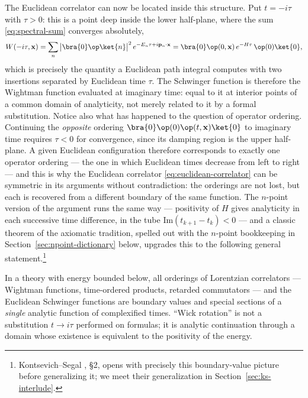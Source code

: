The Euclidean correlator can now be located inside this structure. Put $t =
-i\tau$ with
$\tau > 0$: this is a point deep inside the lower half-plane, where the sum
\eqref{eq:spectral-sum} converges absolutely,
\begin{equation}
W(-i\tau, \mathbf{x}) = \sum_n \big|\bra{0}\op\ket{n}\big|^2\,
   e^{-E_n \tau + i \mathbf{p}_n\cdot\mathbf{x}}
= \bra{0}\op(0,\mathbf{x})\, e^{-H\tau}\, \op(0)\ket{0},
\end{equation}
which is precisely the quantity a Euclidean path integral computes with two
insertions separated by Euclidean time $\tau$. The Schwinger function is
therefore the Wightman function evaluated at imaginary time: equal to it at
interior points of a common domain of analyticity, not merely related to it
by a formal substitution. Notice also what has happened to the question of
operator ordering. Continuing the \emph{opposite} ordering
$\bra{0}\op(0)\op(t,\mathbf{x})\ket{0}$ to imaginary time requires $\tau < 0$
for convergence, since its damping region is the upper half-plane. A given
Euclidean configuration therefore corresponds to exactly one operator
ordering --- the one in which Euclidean times decrease from left to right ---
and this is why the Euclidean correlator
\eqref{eq:euclidean-correlator} can be symmetric in its arguments without
contradiction: the orderings are not lost, but each is recovered from a
different boundary of the same function. The $n$-point version of the
argument runs the same way --- positivity of $H$ gives analyticity in each
successive time difference, in the tube $\mathrm{Im}(t_{k+1} - t_k) < 0$ ---
and a classic theorem of the axiomatic tradition, spelled out with the
$n$-point bookkeeping in Section~\ref{sec:npoint-dictionary} below, upgrades
this to the following general statement.\footnote{%
Kontsevich--Segal , \S2, opens with precisely this
boundary-value picture before generalizing it; we meet their generalization
in Section~\ref{sec:ks-interlude}.}

\begin{iidea}
\label{idea:one-function}
In a theory with energy bounded below, all orderings of Lorentzian correlators
--- Wightman functions, time-ordered products, retarded commutators --- and the
Euclidean Schwinger functions are boundary values and special sections of a
\emph{single} analytic function of complexified times. ``Wick rotation'' is not
a substitution $t \to i\tau$ performed on formulas; it is analytic continuation
through a domain whose existence is equivalent to the positivity of the energy.
\end{iidea}

